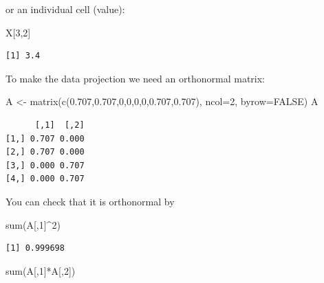 \documentclass[
  letterpaper,
]{krantz}
\newenvironment{Shaded}{\begin{snugshade}}{\end{snugshade}}
\newcommand{\AttributeTok}[1]{\textcolor[rgb]{0.40,0.45,0.13}{#1}}
\newcommand{\ConstantTok}[1]{\textcolor[rgb]{0.56,0.35,0.01}{#1}}
\newcommand{\DecValTok}[1]{\textcolor[rgb]{0.68,0.00,0.00}{#1}}
\newcommand{\FloatTok}[1]{\textcolor[rgb]{0.68,0.00,0.00}{#1}}
\newcommand{\FunctionTok}[1]{\textcolor[rgb]{0.28,0.35,0.67}{#1}}
\newcommand{\NormalTok}[1]{\textcolor[rgb]{0.00,0.23,0.31}{#1}}
\newcommand{\OtherTok}[1]{\textcolor[rgb]{0.00,0.23,0.31}{#1}}
\newcommand{\SpecialCharTok}[1]{\textcolor[rgb]{0.37,0.37,0.37}{#1}}
\begin{document}
or an individual cell (value):

\begin{Shaded}
\begin{Highlighting}[]
\NormalTok{X[}\DecValTok{3}\NormalTok{,}\DecValTok{2}\NormalTok{]}
\end{Highlighting}
\end{Shaded}

\begin{verbatim}
[1] 3.4
\end{verbatim}

To make the data projection we need an orthonormal matrix:

\begin{Shaded}
\begin{Highlighting}[]
\NormalTok{A }\OtherTok{\textless{}{-}} \FunctionTok{matrix}\NormalTok{(}\FunctionTok{c}\NormalTok{(}\FloatTok{0.707}\NormalTok{,}\FloatTok{0.707}\NormalTok{,}\DecValTok{0}\NormalTok{,}\DecValTok{0}\NormalTok{,}\DecValTok{0}\NormalTok{,}\DecValTok{0}\NormalTok{,}\FloatTok{0.707}\NormalTok{,}\FloatTok{0.707}\NormalTok{), }\AttributeTok{ncol=}\DecValTok{2}\NormalTok{, }\AttributeTok{byrow=}\ConstantTok{FALSE}\NormalTok{)}
\NormalTok{A}
\end{Highlighting}
\end{Shaded}

\begin{verbatim}
      [,1]  [,2]
[1,] 0.707 0.000
[2,] 0.707 0.000
[3,] 0.000 0.707
[4,] 0.000 0.707
\end{verbatim}

You can check that it is orthonormal by

\begin{Shaded}
\begin{Highlighting}[]
\FunctionTok{sum}\NormalTok{(A[,}\DecValTok{1}\NormalTok{]}\SpecialCharTok{\^{}}\DecValTok{2}\NormalTok{)}
\end{Highlighting}
\end{Shaded}

\begin{verbatim}
[1] 0.999698
\end{verbatim}

\begin{Shaded}
\begin{Highlighting}[]
\FunctionTok{sum}\NormalTok{(A[,}\DecValTok{1}\NormalTok{]}\SpecialCharTok{*}\NormalTok{A[,}\DecValTok{2}\NormalTok{])}
\end{Highlighting}
\end{Shaded}
\end{document}
